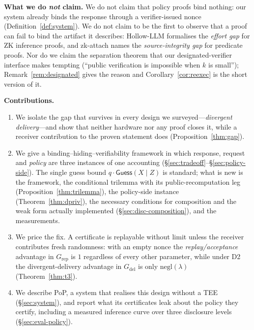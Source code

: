 \documentclass[10pt,journal,compsoc]{IEEEtran}
\begin{document}
\smallskip
\noindent\textbf{What we do \emph{not} claim.} We do not claim that policy proofs
bind nothing: our system already binds the response through a verifier-issued
nonce (Definition~\ref{def:system}). We do not claim to be the first to observe
that a proof can fail to bind the artifact it describes: Hollow-LLM
\cite{hollowllm} formalises the \emph{effort gap} for ZK inference proofs, and
zk-attach \cite{zkattach} names the \emph{source-integrity gap} for predicate
proofs. Nor do we claim the separation theorem that our designated-verifier
interface makes tempting (``public verification is impossible when $k$ is
small''); Remark~\ref{rem:designated} gives the reason and
Corollary~\ref{cor:reexec} is the short version of it.

\smallskip
\noindent\textbf{Contributions.}
\begin{enumerate}
  \item We isolate the gap that survives in every design we surveyed---\emph{divergent
  delivery}---and show that neither hardware nor any proof closes it, while a
  receiver contribution to the proven statement does
  (Proposition~\ref{thm:gap}).
  \item We give a binding--hiding--verifiability framework in which response,
  request and \emph{policy} are three instances of one accounting
  (\S\ref{sec:tradeoff}--\S\ref{sec:policy-side}). The single guess bound
  $q\cdot\mathsf{Guess}(X\mid Z)$ is standard; what is new is the framework, the
  conditional trilemma with its public-recomputation leg
  (Proposition~\ref{thm:trilemma}), the policy-side instance
  (Theorem~\ref{thm:dpriv}), the necessary conditions for composition and the
  weak form actually implemented (\S\ref{sec:disc-composition}), and the
  measurements.
  \item We price the fix. A certificate is replayable without limit unless the
  receiver contributes fresh randomness: with an empty nonce the
  \emph{replay/acceptance} advantage in $G_{\mathrm{rep}}$ is $1$ regardless of
  every other parameter, while under D2 the divergent-delivery advantage in
  $G_{\mathrm{del}}$ is only $\mathrm{negl}(\lambda)$ (Theorem~\ref{thm:t3}).
  \item We describe PoP, a system that realises this design without a TEE
  (\S\ref{sec:system}), and report what its certificates leak about the policy
  they certify, including a measured inference curve over three disclosure
  levels (\S\ref{sec:eval-policy}).
\end{enumerate}
\end{document}
